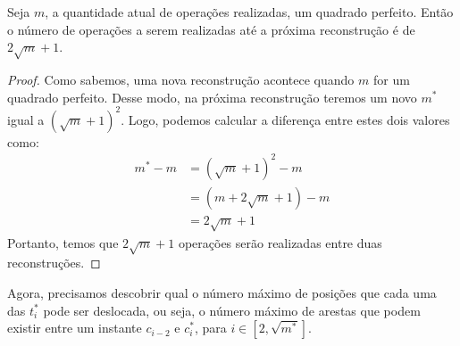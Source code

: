 \begin{corollary}
    \label{coro:amt-op}
    Seja $m$, a quantidade atual de operações realizadas, um quadrado perfeito. Então o número de operações a serem realizadas até a próxima reconstrução é de $2 \sqrt{m} + 1$.
\end{corollary}
\begin{proof}
    Como sabemos, uma nova reconstrução acontece quando $m$ for um quadrado perfeito. Desse modo, na próxima reconstrução teremos um novo $m^*$ igual a $(\sqrt{m} + 1)^2$. Logo, podemos calcular a diferença entre estes dois valores como:
    \begin{align*}
        m^* - m & = (\sqrt{m} + 1)^2 - m    \\
                & = (m + 2\sqrt{m} + 1) - m \\
                & = 2\sqrt{m} + 1
    \end{align*}
    Portanto, temos que $2\sqrt{m} + 1$ operações serão realizadas entre duas reconstruções.
\end{proof}

Agora, precisamos descobrir qual o número máximo de posições que cada uma das $t_i^*$ pode ser deslocada, ou seja, o número máximo de arestas que podem existir entre um instante $c_{i-2}$ e $c_i^*$, para $i \in [2,\sqrt{m^*}]$.

